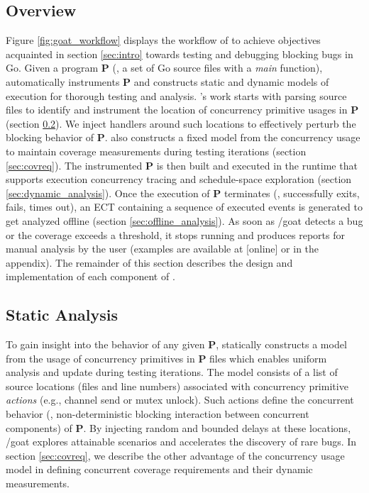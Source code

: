 \subsection{Overview}
\label{sec:overview}
Figure \ref{fig:goat_workflow} displays the workflow of \goat to achieve objectives acquainted in section \ref{sec:intro} towards testing and debugging blocking bugs in Go.
%
Given a program \textbf{P} (\ie, a set of Go source files with a \textit{main} function), \goat automatically instruments \textbf{P} and constructs static and dynamic models of execution for thorough testing and analysis.
%
\goat's work starts with parsing source files to identify and instrument the location of concurrency primitive usages in \textbf{P} (section \ref{sec:static_analysis}).
%
We inject \goat handlers around such locations to effectively perturb the blocking behavior of \textbf{P}.
%
\goat also constructs a fixed model from the concurrency usage to maintain coverage measurements during testing iterations (section \ref{sec:covreq}).
%
The instrumented \textbf{P} is then built and executed in the \goat runtime that supports execution concurrency tracing and schedule-space exploration (section \ref{sec:dynamic_analysis}).
%
Once the execution of \textbf{P} terminates (\eg, successfully exits, fails, times out), an ECT containing a sequence of executed events is generated to get analyzed offline (section \ref{sec:offline_analysis}).
%
As soon as /goat detects a bug or the coverage exceeds a threshold, it stops running and produces reports for manual analysis by the user (examples are available at [online] or in the appendix).
%
The remainder of this section describes the design and implementation of each component of \goat.

\subsection{Static Analysis}
\label{sec:static_analysis}

To gain insight into the behavior of any given \textbf{P}, \goat statically constructs a model from the usage of concurrency primitives in \textbf{P} files which enables uniform analysis and update during testing iterations.
%
The model consists of a list of source locations (files and line numbers) associated with concurrency primitive \textit{actions} (e.g., channel send or mutex unlock).
%
Such actions define the concurrent behavior (\ie, non-deterministic blocking interaction between concurrent components) of \textbf{P}.
%
By injecting random and bounded delays at these locations, /goat explores attainable scenarios and accelerates the discovery of rare bugs.
%
In section \ref{sec:covreq}, we describe the other advantage of the concurrency usage model in defining concurrent coverage requirements and their dynamic measurements.
%

